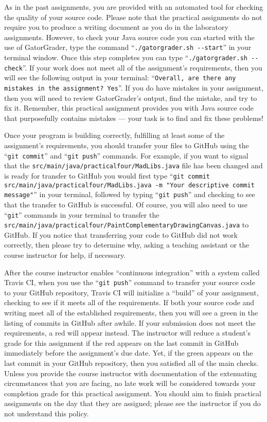 \documentclass[11pt]{article}
\newcommand{\mainprogramsource}{\lstinline{src/main/java/practicalfour/MadLibs.java}}
\newcommand{\secondprogramsource}{\lstinline{src/main/java/practicalfour/PaintComplementaryDrawingCanvas.java}}
\newcommand{\gatorgraderstart}{\command{./gatorgrader.sh --start}}
\newcommand{\gatorgradercheck}{\command{./gatorgrader.sh --check}}
\newcommand{\gitcommit}{\command{git commit}}
\newcommand{\gitpush}{\command{git push}}
\newcommand{\gitcommitmainprogram}{\command{git commit src/main/java/practicalfour/MadLibs.java -m "Your
descriptive commit message"}}
\newcommand{\command}[1]{``\lstinline{#1}''}
\newcommand{\step}[1]{``{#1}''}
\newcommand{\checkmark}{\ding{51}}
\newcommand{\naughtmark}{\ding{55}}
\begin{document}
As in the past assignments, you are provided with an automated tool for checking
the quality of your source code. Please note that the practical assignments do
not require you to produce a writing document as you do in the laboratory
assignments. However, to check your Java source code you can started with the
use of GatorGrader, type the command \gatorgraderstart{} in your terminal
window. Once this step completes you can type \gatorgradercheck{}. If your work
does not meet all of the assignment's requirements, then you will see the
following output in your terminal: \command{Overall, are there any mistakes in
the assignment? Yes}. If you do have mistakes in your assignment, then you will
need to review GatorGrader's output, find the mistake, and try to fix it.
Remember, this practical assignment provides you with Java source code that
purposefully contains mistakes --- your task is to find and fix these problems!

Once your program is building correctly, fulfilling at least some of the assignment's requirements, you should transfer
your files to GitHub using the \gitcommit{} and \gitpush{} commands. For example, if you want to signal that the
\mainprogramsource{} file has been changed and is ready for transfer to GitHub you would first type
\gitcommitmainprogram{} in your terminal, followed by typing \gitpush{} and checking to see that the transfer to GitHub
is successful. Of course, you will also need to use \command{git} commands in your terminal to transfer the
\secondprogramsource{} to GitHub. If you notice that transferring your code to GitHub did not work correctly, then
please try to determine why, asking a teaching assistant or the course instructor for help, if necessary.

After the course instructor enables \step{continuous integration} with a system
called Travis CI, when you use the \gitpush{} command to transfer your source
code to your GitHub repository, Travis CI will initialize a \step{build} of your
assignment, checking to see if it meets all of the requirements. If both your
source code and writing meet all of the established requirements, then you will
see a green \checkmark{} in the listing of commits in GitHub after awhile. If
your submission does not meet the requirements, a red \naughtmark{} will appear
instead. The instructor will reduce a student's grade for this assignment if the
red \naughtmark{} appears on the last commit in GitHub immediately before the
assignment's due date. Yet, if the green \checkmark{} appears on the last commit
in your GitHub repository, then you satisfied all of the main checks. Unless you
provide the course instructor with documentation of the extenuating
circumstances that you are facing, no late work will be considered towards your
completion grade for this practical assignment. You should aim to finish
practical assignments on the day that they are assigned; please see the
instructor if you do not understand this policy.
\end{document}
